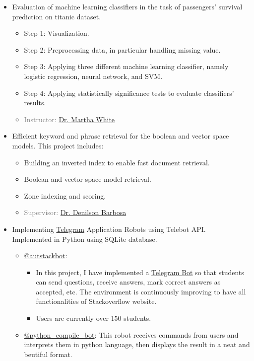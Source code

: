 \begin{itemize}
		\item Evaluation of machine learning classifiers in the task of passengers' survival prediction on titanic dataset.
		\begin{itemize}
			\item Step 1: Visualization.
			\item Step 2: Preprocessing data, in particular handling missing value.
			\item Step 3: Applying three different machine learning classifier, namely logistic regression, neural network, and SVM.
			\item Step 4: Applying statistically significance tests to evaluate classifiers' results.
			\item \textcolor{gray}{Instructor: \href{http://webdocs.cs.ualberta.ca/~whitem/}{Dr. Martha White}}
		\end{itemize}
	
		\item Efficient keyword and phrase retrieval for the boolean and vector space models. This project includes:
		\begin{itemize}
			\item Building an inverted index to enable fast document retrieval.
			\item Boolean and vector space model retrieval.
			\item Zone indexing and scoring.
			\item \textcolor{gray}{Supervisor: \href{https://sites.ualberta.ca/~denilson/}{Dr. Denilson Barbosa}}
		\end{itemize}
	
		\item Implementing \href{https://telegram.org/}{Telegram} Application Robots using Telebot API.\\
		Implemented in Python using SQLite database.
		\begin{itemize}
			\item \href{https://telegram.me/autstackbot}{@autstackbot}:
			\begin{itemize}
				\item In this project, I have implemented a \href{https://telegram.org/blog/bot-revolution}{Telegram Bot} so that students can send questions, receive answers, mark correct answers as accepted, etc. The environment is continuously improving to have all functionalities of Stackoverflow website.
				\item Users are currently over 150 students.
			\end{itemize}
			\item \href{https://telegram.me/python_compile_bot}{@python\_compile\_bot}: This robot receives commands from users and interprets them in python language, then displays the result in a neat and beutiful format.
		\end{itemize}
		

\end{itemize}
